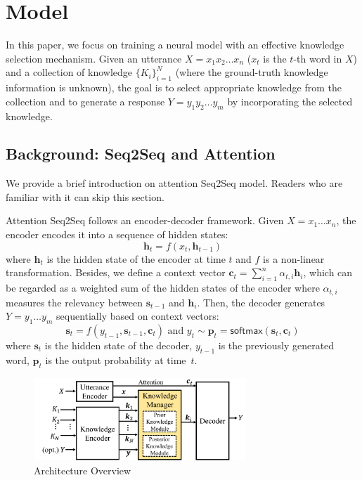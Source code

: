 \documentclass{article}
\begin{document}
\section{Model}
In this paper, we focus on training a neural model with an effective knowledge selection mechanism.
Given an utterance  $X = x_1x_2\ldots x_n$ ($x_t$ is the $t$-th word in $X$) 
and a collection of knowledge $\{K_i\}_{i=1}^N$ 
(where the ground-truth knowledge information is unknown),
the goal is to select appropriate knowledge from the collection and
to generate a response $Y = y_1 y_2\ldots y_m$ by incorporating the selected knowledge.

\subsection{Background: Seq2Seq and Attention}
We provide a brief introduction on attention Seq2Seq model.
Readers who are familiar with it can skip this section.

Attention Seq2Seq \cite{vinyals2015neural} follows an encoder-decoder framework.
%
Given $X = x_1\ldots x_n$,
the encoder encodes it into a sequence of hidden states: 
\begin{equation}
    \mathbf{h}_t = f(x_t, \mathbf{h}_{t-1})
    \label{eqn:encode}
\end{equation}
where $\mathbf{h}_t$ is the hidden state of the encoder at time $t$
and $f$ is a non-linear transformation.
Besides, we define a context vector
$\mathbf{c}_t = \sum_{i=1}^n \alpha_{t,i} \mathbf{h}_i$,
which can be regarded as a weighted sum of the hidden states of the encoder 
where $\alpha_{t,i}$ measures the relevancy between $\mathbf{s}_{t-1}$ and $\mathbf{h}_i$.
%
Then, the decoder generates  $Y = y_1\ldots y_m$ sequentially based on context vectors:
\begin{equation}
    \mathbf{s}_t = f(y_{t-1}, \mathbf{s}_{t-1}, \mathbf{c}_t) \textrm{ and } y_t \sim \mathbf{p}_t = \mathsf{softmax}(\mathbf{s}_t, \mathbf{c}_t)
\label{eqn:context}
\end{equation}
where $\mathbf{s}_t$ is the hidden state of the decoder, $y_{t-1}$ is the previously generated word, $\mathbf{p}_t$ is the output probability at time~$t$.
\fi

\begin{figure}[tb]
\centering
\includegraphics[width=8cm]{overview.pdf}
\vspace{-0.2cm}
\caption{Architecture Overview}
\vspace{-0.2cm}
\label{fig:overview}
\end{figure}
\end{document}
